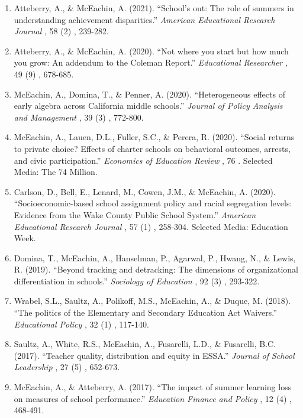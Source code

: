\documentclass[11pt, letterpaper]{article}
\begin{document}
\begin{enumerate}[leftmargin=2em]
  \item Atteberry, A., \& McEachin, A. (2021).
  ``School's out: The role of summers in understanding achievement disparities.''
  \textit{American Educational Research Journal}%
, 58%
(2)%
, 239-282.

  \item Atteberry, A., \& McEachin, A. (2020).
  ``Not where you start but how much you grow: An addendum to the Coleman Report.''
  \textit{Educational Researcher}%
, 49%
(9)%
, 678-685.

  \item McEachin, A., Domina, T., \& Penner, A. (2020).
  ``Heterogeneous effects of early algebra across California middle schools.''
  \textit{Journal of Policy Analysis and Management}%
, 39%
(3)%
, 772-800.

  \item McEachin, A., Lauen, D.L., Fuller, S.C., \& Perera, R. (2020).
  ``Social returns to private choice? Effects of charter schools on behavioral outcomes, arrests, and civic participation.''
  \textit{Economics of Education Review}%
, 76%
%
.
  Selected Media: The 74 Million.

  \item Carlson, D., Bell, E., Lenard, M., Cowen, J.M., \& McEachin, A. (2020).
  ``Socioeconomic-based school assignment policy and racial segregation levels: Evidence from the Wake County Public School System.''
  \textit{American Educational Research Journal}%
, 57%
(1)%
, 258-304.
  Selected Media: Education Week.

  \item Domina, T., McEachin, A., Hanselman, P., Agarwal, P., Hwang, N., \& Lewis, R. (2019).
  ``Beyond tracking and detracking: The dimensions of organizational differentiation in schools.''
  \textit{Sociology of Education}%
, 92%
(3)%
, 293-322.

  \item Wrabel, S.L., Saultz, A., Polikoff, M.S., McEachin, A., \& Duque, M. (2018).
  ``The politics of the Elementary and Secondary Education Act Waivers.''
  \textit{Educational Policy}%
, 32%
(1)%
, 117-140.

  \item Saultz, A., White, R.S., McEachin, A., Fusarelli, L.D., \& Fusarelli, B.C. (2017).
  ``Teacher quality, distribution and equity in ESSA.''
  \textit{Journal of School Leadership}%
, 27%
(5)%
, 652-673.

  \item McEachin, A., \& Atteberry, A. (2017).
  ``The impact of summer learning loss on measures of school performance.''
  \textit{Education Finance and Policy}%
, 12%
(4)%
, 468-491.


\end{enumerate}
\end{document}
